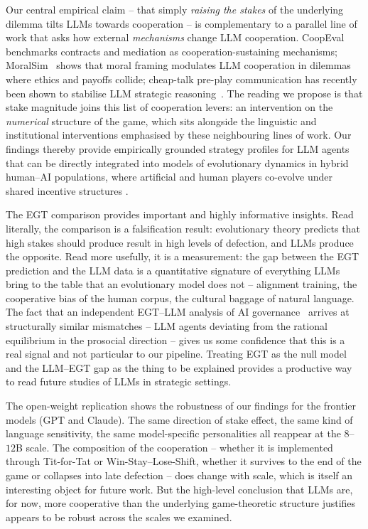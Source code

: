 \documentclass[a4paper,fleqn]{cas-sc}
\begin{document}
Our central empirical claim -- that simply \emph{raising the stakes} of the underlying dilemma tilts LLMs towards cooperation -- is complementary to a parallel line of work that asks how external \emph{mechanisms} change LLM cooperation. CoopEval~\cite{tewolde2026coopeval} benchmarks contracts and mediation as cooperation-sustaining mechanisms; MoralSim~\cite{backmann2025moralsim} shows that moral framing modulates LLM cooperation in dilemmas where ethics and payoffs collide; cheap-talk pre-play communication has recently been shown to stabilise LLM strategic reasoning~\cite{loreheydari2026communication}. The reading we propose is that stake magnitude joins this list of cooperation levers: an intervention on the \emph{numerical} structure of the game, which sits alongside the linguistic and institutional interventions emphasised by these neighbouring lines of work.
Our findings thereby provide empirically grounded strategy profiles for LLM agents that can be directly integrated into models of evolutionary dynamics in hybrid human–AI populations, where artificial and human players co-evolve under shared incentive structures \cite{han2026social}.


The EGT comparison provides important and highly informative insights. Read literally, the comparison is a falsification result: evolutionary theory predicts that high stakes should produce result in high levels of defection, and LLMs produce the opposite. Read more usefully, it is a measurement: the gap between the EGT prediction and the LLM data is a quantitative signature of everything LLMs bring to the table that an evolutionary model does not -- alignment training, the cooperative bias of the human corpus, the cultural baggage of natural language. The fact that an independent EGT--LLM analysis of AI governance~\cite{balabanova2025media,buscemi2025llms} arrives at structurally similar mismatches -- LLM agents deviating from the rational equilibrium in the prosocial direction -- gives us some confidence that this is a real signal and not particular to our pipeline. Treating EGT as the null model and the LLM--EGT gap as the thing to be explained provides a productive way to read future studies of LLMs in strategic settings.

The open-weight replication shows the robustness of our findings for the frontier models (GPT and Claude). The same direction of stake effect, the same kind of language sensitivity, the same model-specific personalities all reappear at the $8$--$12$B scale.%
The composition of the cooperation -- whether it is implemented through Tit-for-Tat or Win-Stay--Lose-Shift, whether it survives to the end of the game or collapses into late defection -- does change with scale, which is itself an interesting object for future work. But the high-level conclusion that LLMs are, for now, more cooperative than the underlying game-theoretic structure justifies appears to be robust across the scales we examined.
\end{document}
